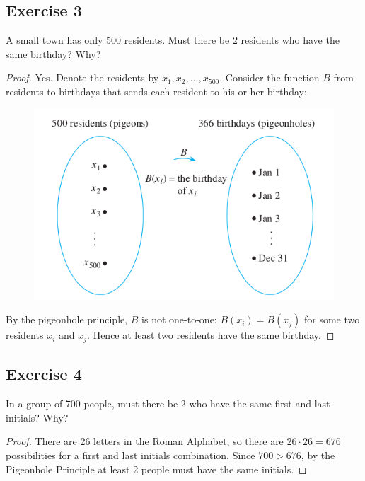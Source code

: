 \documentclass[14pt]{extarticle}
\begin{document}
\subsection{Exercise 3}
A small town has only 500 residents. Must there be 2 residents who have the same birthday? Why?

\begin{proof}
     Yes. Denote the residents by \(x_1, x_2, \ldots, x_{500}\). Consider the function \(B\) from residents to birthdays
     that sends each resident to his or her birthday:

     \begin{figure}[ht!]
          \centering
          \includegraphics[scale=0.4]{../images/9.4.3.png}
     \end{figure}

     By the pigeonhole principle, \(B\) is not one-to-one: \(B(x_i) = B(x_j)\) for some two residents \(x_i\) and
     \(x_j\). Hence at least two residents have the same birthday.
\end{proof}

\subsection{Exercise 4}
In a group of 700 people, must there be 2 who have the same first and last initials? Why?

\begin{proof}
     There are 26 letters in the Roman Alphabet, so there are \(26 \cdot 26 = 676\) possibilities for a first and last
     initials combination. Since \(700 > 676\), by the Pigeonhole Principle at least 2 people must have the same initials.
\end{proof}
\end{document}
